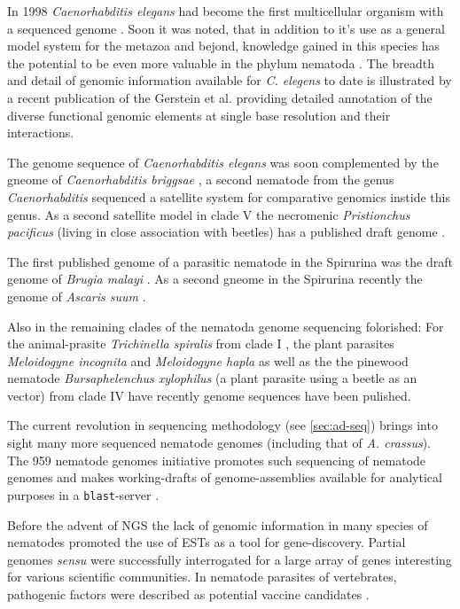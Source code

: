 In 1998 \textit{Caenorhabditis elegans} had become the first
multicellular organism with a sequenced genome
\cite{pmid9851916}. Soon it was noted, that in addition to it's use as
a general model system for the metazoa and bejond, knowledge gained in
this species has the potential to be even more valuable in the phylum
nematoda \cite{blaxter_caenorhabditis_1998}. The breadth and detail of
genomic information available for \textit{C. elegens} to date is
illustrated by a recent publication of the Gerstein et
al. \cite{pmid21177976} providing detailed annotation of the diverse
functional genomic elements at single base resolution and their
interactions.

The genome sequence of \textit{Caenorhabditis elegans} was soon
complemented by the gneome of \textit{Caenorhabditis briggsae}
\cite{stein_genome_2003}, a second nematode from the genus
\textit{Caenorhabditis} sequenced a satellite system for comparative
genomics instide this genus. As a second satellite model in clade V
the necromenic \textit{Pristionchus pacificus} (living in close
association with beetles) has a published draft genome
\cite{pmid18806794}.

The first published genome of a parasitic nematode in the Spirurina
was the draft genome of \textit{Brugia malayi}
\cite{ghedin_draft_2007}. As a second gneome in the Spirurina recently
the genome of \textit{Ascaris suum} \cite{pmid22031327}.

Also in the remaining clades of the nematoda genome sequencing
folorished: For the animal-prasite \textit{Trichinella spiralis} from
clade I \cite{pmid21336279}, the plant parasites \textit{Meloidogyne
  incognita} \cite{pmid18660804} and \textit{Meloidogyne hapla}
\cite{pmid18809916} as well as the the pinewood nematode
\textit{Bursaphelenchus xylophilus} \cite{pmid21909270} (a plant
parasite using a beetle as an vector) from clade IV have recently
genome sequences have been pulished.

The current revolution in sequencing methodology (see
\ref{sec:ad-seq}) brings into sight many more sequenced nematode
genomes (including that of \textit{A. crassus}). The 959 nematode
genomes initiative promotes such sequencing of nematode genomes and
makes working-drafts of genome-assemblies available for analytical
purposes in a \texttt{blast}-server \cite{pmid22058131} .

Before the advent of NGS the lack of genomic information in many
species of nematodes promoted the use of ESTs as a tool for
gene-discovery. Partial genomes \textit{sensu}
\cite{parkinson_partigene--constructing_2004} were successfully
interrogated for a large array of genes interesting for various
scientific communities. In nematode parasites of vertebrates,
pathogenic factors were described as potential vaccine candidates
\cite{pmid11406138}.

